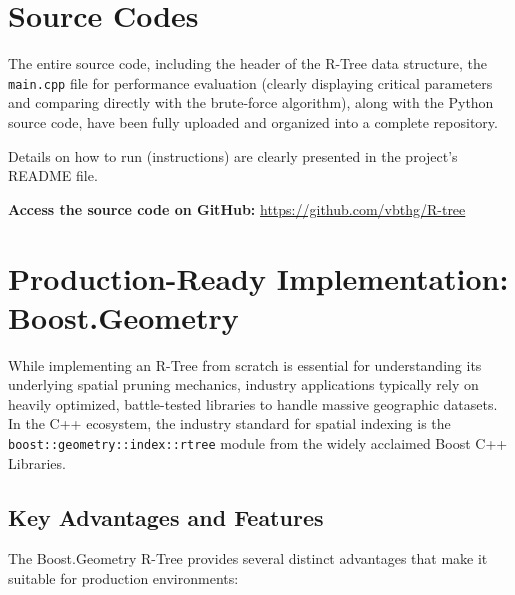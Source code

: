 \documentclass[a4paper, 10pt, titlepage]{report}
\begin{document}
\section{Source Codes}

The entire source code, including the header of the R-Tree data structure, the \texttt{main.cpp} file for performance evaluation (clearly displaying critical parameters and comparing directly with the brute-force algorithm), along with the Python source code, have been fully uploaded and organized into a complete repository.

Details on how to run (instructions) are clearly presented in the project's README file.

\textbf{Access the source code on GitHub:} \url{https://github.com/vbthg/R-tree}

\section{Production-Ready Implementation: Boost.Geometry}

While implementing an R-Tree from scratch is essential for understanding its underlying spatial pruning mechanics, industry applications typically rely on heavily optimized, battle-tested libraries to handle massive geographic datasets. In the C++ ecosystem, the industry standard for spatial indexing is the \texttt{boost::geometry::index::rtree} module from the widely acclaimed Boost C++ Libraries.

\subsection{Key Advantages and Features}
The Boost.Geometry R-Tree provides several distinct advantages that make it suitable for production environments:
\end{document}
